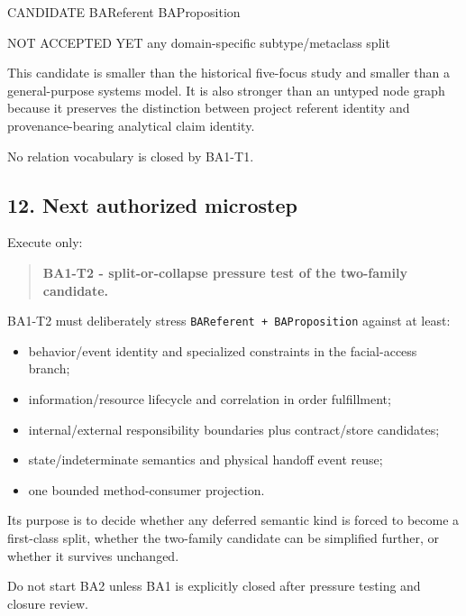 \documentclass[
]{article}
\newenvironment{Shaded}{}{}
\newcommand{\NormalTok}[1]{#1}
\providecommand{\tightlist}{%
  \setlength{\itemsep}{0pt}\setlength{\parskip}{0pt}}
\begin{document}
\begin{Shaded}
\begin{Highlighting}[]
\NormalTok{CANDIDATE}
\NormalTok{    BAReferent}
\NormalTok{    BAProposition}

\NormalTok{NOT ACCEPTED YET}
\NormalTok{    any domain{-}specific subtype/metaclass split}
\end{Highlighting}
\end{Shaded}

This candidate is smaller than the historical five-focus study and
smaller than a general-purpose systems model. It is also stronger than
an untyped node graph because it preserves the distinction between
project referent identity and provenance-bearing analytical claim
identity.

No relation vocabulary is closed by BA1-T1.

\subsection{12. Next authorized
microstep}\label{12-next-authorized-microstep}

Execute only:

\begin{quote}
\textbf{BA1-T2 - split-or-collapse pressure test of the two-family
candidate.}
\end{quote}

BA1-T2 must deliberately stress \texttt{BAReferent\ +\ BAProposition}
against at least:

\begin{itemize}
\tightlist
\item
  behavior/event identity and specialized constraints in the
  facial-access branch;
\item
  information/resource lifecycle and correlation in order fulfillment;
\item
  internal/external responsibility boundaries plus contract/store
  candidates;
\item
  state/indeterminate semantics and physical handoff event reuse;
\item
  one bounded method-consumer projection.
\end{itemize}

Its purpose is to decide whether any deferred semantic kind is forced to
become a first-class split, whether the two-family candidate can be
simplified further, or whether it survives unchanged.

Do not start BA2 unless BA1 is explicitly closed after pressure testing
and closure review.
\end{document}
